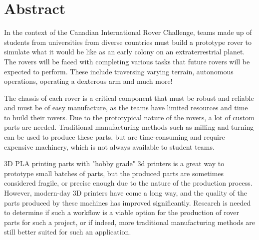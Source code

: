 \documentclass[type=report,foot=true,colorhead=true]{rwuthesis} %
\title{\batitle}
\author{Jose Luiz S. Mendonça}
\date{\today}
\begin{document}
\maketitle

\newpage
\tableofcontents
\newpage

\chapter{Abstract}




	In the context of the Canadian International Rover Challenge, teams made up of students from universities from diverse countries must build a prototype rover to simulate what it would be like as an early colony on an extraterrestrial planet. The rovers will be faced with completing various tasks that future rovers will be expected to perform. These include traversing varying terrain, autonomous operations, operating a dexterous arm and much more!

	The chassis of each rover is a critical component that must be robust and reliable and must be of easy manufacture, as the teams have limited resources and time to build their rovers. Due to the prototypical nature of the rovers, a lot of custom parts are needed. Traditional manufacturing methods such as milling and turning can be used to produce these parts, but are time-consuming and require expensive machinery, which is not always available to student teams.

	3D PLA printing parts with "hobby grade" 3d printers is a great way to prototype small batches of parts, but the produced parts are sometimes considered fragile, or precise enough due to the nature of the production process. However, modern-day 3D printers have come a long way, and the quality of the parts produced by these machines has improved significantly. Research is needed to determine if such a workflow is a viable option for the production of rover parts for such a project, or if indeed, more traditional manufacturing methods are still better suited for such an application.
\end{document}
